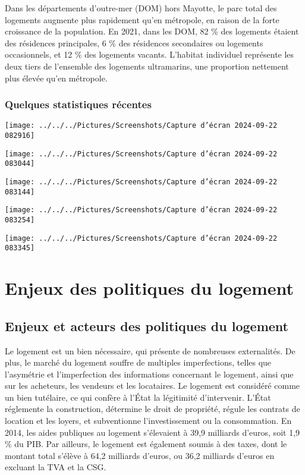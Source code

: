 \documentclass[a4paper, 12pt]{report}
\begin{document}
Dans les départements d’outre-mer (DOM) hors Mayotte, le parc total des logements augmente plus rapidement qu’en métropole, en raison de la forte croissance de la population. En 2021, dans les DOM, 82 \% des logements étaient des résidences principales, 6 \% des résidences secondaires ou logements occasionnels, et 12 \% des logements vacants. L’habitat individuel représente les deux tiers de l’ensemble des logements ultramarins, une proportion nettement plus élevée qu’en métropole.

\subsubsection{Quelques statistiques récentes}

\begin{center}
	\texttt{[image: ../../../Pictures/Screenshots/Capture d'écran 2024-09-22 082916]}
	
	\texttt{[image: ../../../Pictures/Screenshots/Capture d'écran 2024-09-22 083044]}
	
	\texttt{[image: ../../../Pictures/Screenshots/Capture d'écran 2024-09-22 083144]}
	
	\texttt{[image: ../../../Pictures/Screenshots/Capture d'écran 2024-09-22 083254]}
	
	\texttt{[image: ../../../Pictures/Screenshots/Capture d'écran 2024-09-22 083345]}
	
\end{center}

\section{Enjeux des politiques du logement}

\subsection{Enjeux et acteurs des politiques du logement}



Le logement est un bien nécessaire, qui présente de nombreuses externalités. De plus, le marché du logement souffre de multiples imperfections, telles que l'asymétrie et l'imperfection des informations concernant le logement, ainsi que sur les acheteurs, les vendeurs et les locataires. Le logement est considéré comme un bien tutélaire, ce qui confère à l'État la légitimité d'intervenir. L'État réglemente la construction, détermine le droit de propriété, régule les contrats de location et les loyers, et subventionne l’investissement ou la consommation. En 2014, les aides publiques au logement s'élevaient à 39,9 milliards d’euros, soit 1,9 \% du PIB. Par ailleurs, le logement est également soumis à des taxes, dont le montant total s’élève à 64,2 milliards d’euros, ou 36,2 milliards d’euros en excluant la TVA et la CSG.
\end{document}
